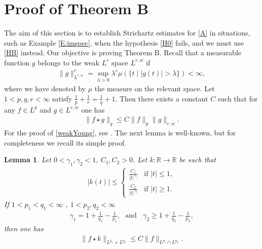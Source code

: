 \documentclass[11pt,letter]{amsart}
\newcommand{\la}{\lambda}
\numberwithin{equation}{section}
\newtheorem{lemma}[theorem]{Lemma}
\numberwithin{equation}{section}
\begin{document}
\section{Proof of Theorem B}\label{S:TB}


The aim of this section is to establish Strichartz estimates for \eqref{A} in situations, such as Example \ref{E:imspec}, when the hypothesis \eqref{H0} fails, and we must use \eqref{HB} instead. Our objective is proving Theorem B. 
Recall that a measurable function $g$ belongs to the weak $L^{r}$ space $L^{r,w}$ if
\begin{align*}
\|g\|_{L^{r,w}}^{r} =\sup_{\la>0}\la^{r}\mu (\{t\mid |g(t)|>\la\})<\infty,
\end{align*}
where we have denoted by $\mu$ the measure on the relevant space.
Let $1<p,q,r<\infty$ satisfy $\frac{1}{p}+\frac{1}{r}=\frac{1}{q}+1$. Then there exists a constant $C$ such that for any $f\in L^{p}$ and $g\in L^{r,w}$ one has
\begin{align}\label{weakYoung}
\|f\star g\|_{q}\le C \|f\|_{p}\|g\|_{r,w}.
\end{align}
For the proof of \eqref{weakYoung}, see \cite{O}. The next lemma is well-known, but for completeness we recall its simple proof. 

\begin{lemma}\label{WighFraInt}
Let $0<\gamma_{1}, \gamma_2 <1$, $C_1,C_2>0$. Let $k:\mathbb{R}\to \mathbb{R}$ be such that
\begin{align*}
|k(t)|\le \begin{cases}
\frac{C_1}{|t|^{\gamma_{1}}} \ \ \ \ \text{if }|t|\le 1,\\
\frac{C_2}{|t|^{\gamma_{2}}} \ \ \ \ \text{if }|t|\ge1.
\end{cases}
\end{align*}
If $1<p_{1}<q_{1}<\infty$ , $1< p_{2}, q_{2} <\infty$
\begin{align*}
\gamma_{1}=1+\frac{1}{q_{1}}-\frac{1}{p_{1}}, \ \ \ \text{and}\ \ \ \ \gamma_{2}\ge1+\frac{1}{q_{2}}-\frac{1}{p_{2}},
\end{align*}  
then one has
\begin{align}\label{meglio}
\|f\star k\|_{L^{q_{1}}+L^{q_{2}}}\le C \|f\|_{L^{p_{1}}\cap L^{p_{2}}}.
\end{align}
\end{lemma}
\end{document}
